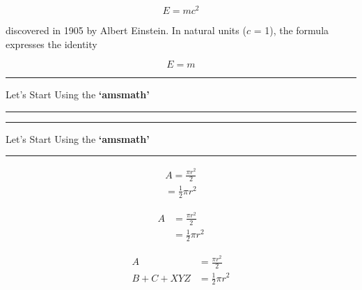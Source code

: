 \documentclass[12pt, letterpaper]{article}
\begin{document}
\[E=mc^2\]

discovered in 1905 by Albert Einstein. 
In natural units ($c$ = 1), the formula expresses the identity

\begin{equation}
E=m
\end{equation}


\newcommand{\titlevariable}{Let's Start Using the \textbf{`amsmath'}}

\noindent\rule{\linewidth}{5pt}
\begin{center}
\titlevariable \par
\end{center}
\noindent\rule{\linewidth}{5pt}


\begin{center}
\noindent\rule{\linewidth}{5pt}
\titlevariable \par
\noindent\rule{\linewidth}{5pt}
\end{center}




\begin{equation*}
\begin{split}
A = \frac{\pi r^2}{2} \\
  = \frac{1}{2} \pi r^2
\end{split}
\end{equation*}




\begin{equation} \label{eq1}
\begin{split}
A & = \frac{\pi r^2}{2} \\
 & = \frac{1}{2} \pi r^2
\end{split}
\end{equation}




\begin{equation}
\begin{split}
A & = \frac{\pi r^2}{2} \\
B +C + X     Y  Z& = \frac{1}{2} \pi r^2
\end{split}
\end{equation}
\end{document}
